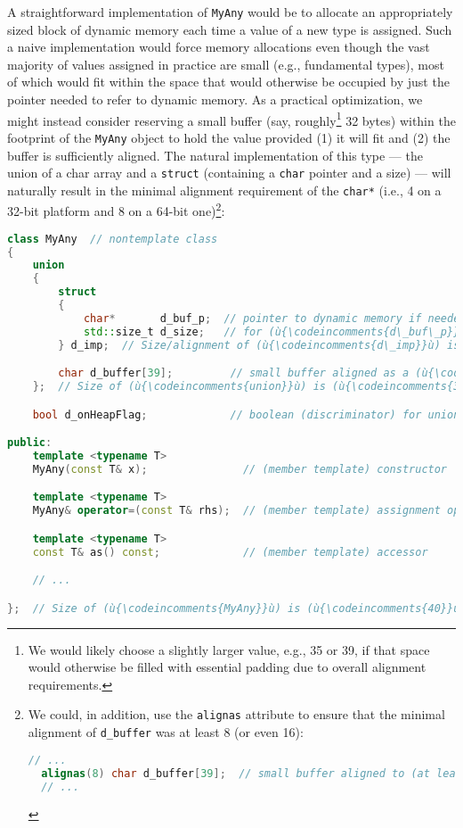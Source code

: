 \noindent A straightforward implementation of \texttt{MyAny} would be to allocate
an appropriately sized block of dynamic memory each time a value of a
new type is assigned. Such a naive implementation would force memory
allocations even though the vast majority of values assigned in practice
are small (e.g., fundamental types), most of which would fit within the
space that would otherwise be occupied by just the pointer needed to
refer to dynamic memory. As a practical optimization, we might instead
consider reserving a small buffer (say, roughly{\cprotect\footnote{We
would likely choose a slightly larger value, e.g., 35 or 39, if that
space would otherwise be filled with essential padding due to overall
  alignment requirements.}} 32 bytes) within the footprint of the
\texttt{MyAny} object to hold the value provided (1) it will fit and (2)
the buffer is sufficiently aligned. The natural implementation of this
type --- the union of a char array and a \texttt{struct} (containing a
\texttt{char} pointer and a size) --- will naturally result in the minimal
alignment requirement of the \texttt{char*} (i.e., 4 on a 32-bit
platform and 8 on a 64-bit one){\cprotect\footnote{We could, in
  addition, use the {\tt alignas} attribute to ensure that
  the minimal alignment of \texttt{d\_buffer} was at least 8 (or even
  16):

  \begin{lstlisting}[language=C++, basicstyle={\ttfamily\footnotesize}]
  // ...
  alignas(8) char d_buffer[39];  // small buffer aligned to (at least) 8
  // ...
  \end{lstlisting}
      }}:

\begin{lstlisting}[language=C++]
class MyAny  // nontemplate class
{
    union
    {
        struct
        {
            char*       d_buf_p;  // pointer to dynamic memory if needed
            std::size_t d_size;   // for (ù{\codeincomments{d\_buf\_p}}ù); same alignment as (ù{\codeincomments{(char*)}}ù)
        } d_imp;  // Size/alignment of (ù{\codeincomments{d\_imp}}ù) is (ù{\codeincomments{sizeof(d\_buf\_p)}}ù) (e.g., 4 or 8).

        char d_buffer[39];         // small buffer aligned as a (ù{\codeincomments{(char*)}}ù)
    };  // Size of (ù{\codeincomments{union}}ù) is (ù{\codeincomments{39}}ù); alignment of (ù{\codeincomments{union}}ù) is (ù{\codeincomments{alignof(char*)}}ù).

    bool d_onHeapFlag;             // boolean (discriminator) for union (above)

public:
    template <typename T>
    MyAny(const T& x);               // (member template) constructor

    template <typename T>
    MyAny& operator=(const T& rhs);  // (member template) assignment operator

    template <typename T>
    const T& as() const;             // (member template) accessor

    // ...

};  // Size of (ù{\codeincomments{MyAny}}ù) is (ù{\codeincomments{40}}ù); alignment of (ù{\codeincomments{MyAny}}ù) is (ù{\codeincomments{alignof(char*)}}ù) (e.g., 8).
\end{lstlisting}
    
